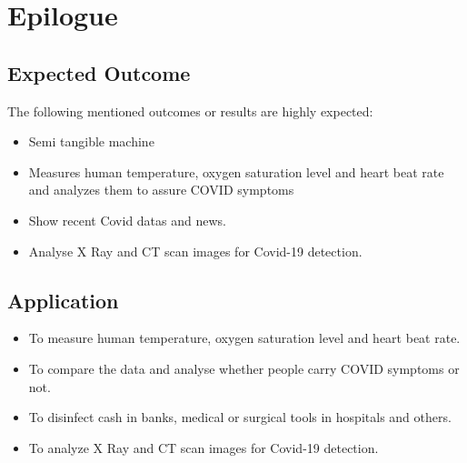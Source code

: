 \documentclass[a4paper,12pt]{report}
\begin{document}
\pagebreak
\chapter{Epilogue}
\section{Expected Outcome}
The following mentioned outcomes or results are highly expected:

\begin{itemize}
\item Semi tangible machine
\item Measures human temperature, oxygen saturation level and heart beat rate and analyzes
them to assure COVID symptoms
\item Show recent Covid datas and news.
\item Analyse X Ray and CT scan images for Covid-19 detection.
\end{itemize}
\section{Application}
\begin{itemize}
\item To measure human temperature, oxygen saturation level and heart beat rate.
\item To compare the data and analyse whether people carry COVID symptoms or not.
\item To disinfect cash in banks, medical or surgical tools in hospitals and others.
\item To analyze X Ray and CT scan images for Covid-19 detection. 
\end{itemize}
\pagebreak
\end{document}
